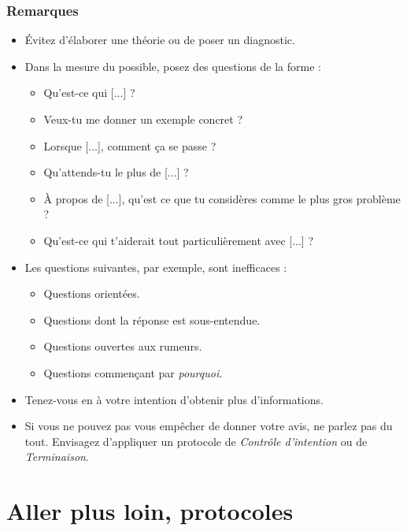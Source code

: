 \documentclass[paper=6in:9in,pagesize=pdftex,headinclude=on,footinclude=on,11pt]{scrbook}
\begin{document}
\subsection{Remarques}
\begin{itemize}
	\item Évitez d'élaborer une théorie ou de poser un diagnostic.
	\item Dans la mesure du possible, posez des questions de la forme :
	      \begin{itemize}
	      	\item \og{}Qu'est-ce qui [...] ?\fg{}
	      	\item \og{}Veux-tu me donner un exemple concret ?\fg{}
	      	\item \og{}Lorsque [...], comment ça se passe ?\fg{}
	      	\item \og{}Qu'attends-tu le plus de [...] ?\fg{}
	      	\item \og{}À propos de [...], qu'est ce que tu considères comme le plus gros problème ?\fg{}
	      	\item \og{}Qu'est-ce qui t'aiderait tout particulièrement avec [...] ?\fg{}
	      \end{itemize}
	\item Les questions suivantes, par exemple, sont inefficaces :
		  \begin{itemize}
		  	\item Questions orientées. %
		    \item Questions dont la réponse est sous-entendue. %
		    \item Questions ouvertes aux rumeurs. %
		    \item Questions commençant par \emph{pourquoi}.
		  \end{itemize}
	\item Tenez-vous en à votre intention d'obtenir plus d'informations.
	\item Si vous ne pouvez pas vous empêcher de donner votre avis, ne parlez pas du tout. Envisagez d'appliquer un protocole de \emph{Contrôle d'intention}
	      ou de \emph{Terminaison}.
\end{itemize}

\chapter{Aller plus loin, protocoles} \label{aller-plus-loin}
\end{document}
